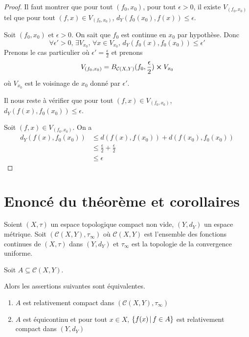 \ifdefined\outputproof
\begin{proof}
	Il faut montrer que pour tout $(f_{0}, x_{0})$, pour tout $\epsilon > 0$,
	il existe $V_{(f_{0}, x_{0})}$ tel que pour tout $(f, x) \in V_{(f_{0},
	x_{0})}$, $d_{Y}(f_{0}(x_{0}), f(x)) \leq \epsilon$.

	Soit $(f_{0}, x_{0})$ et $\epsilon > 0$. On sait que $f_{0}$ est continue en
	$x_{0}$ par hypothèse. Donc
	\begin{equation}
		\forall \epsilon' > 0, \, \exists V_{x_{0}}, \, \forall x \in V_{x_{0}},
		\, d_{Y}(f_{0}(x), f_{0}(x_{0})) \leq \epsilon'
	\end{equation}
	Prenons le cas particulier où $\epsilon' = \frac{\epsilon}{2}$ et prenons
	\begin{equation}
		V_{(f_{0}, x_{0})} = B_{\mathcal{C}(X, Y)}(f_{0}, \frac{\epsilon}{2})
		\cross V_{x_{0}}
	\end{equation}
	où $V_{x_{0}}$ est le voisinage de $x_{0}$ donné par $\epsilon'$.

	Il nous reste à vérifier que pour tout $(f, x) \in V_{(f_{0}, x_{0})}$,
	$d_{Y}(f(x), f_{0}(x_{0})) \leq \epsilon$.

	Soit $(f, x) \in V_{(f_{0}, x_{0})}$. On a
	\begin{align}
		d_{Y}(f(x), f_{0}(x_{0})) & \leq d(f(x), f(x_{0})) + d(f(x_{0}), f_{0}(x_{0}))
		\\
		& \leq \frac{\epsilon}{2} + \frac{\epsilon}{2} \\
		& \leq \epsilon
	\end{align}
\end{proof}
\fi

\section{Enoncé du théorème et corollaires}

\begin{theorem} 
	Soient $(X, \tau)$ un espace topologique compact non vide, $(Y, d_{Y})$ un
	espace métrique. Soit $(\mathcal{C}(X, Y), \tau_{\infty})$ où
	$\mathcal{C}(X, Y)$ est l'ensemble des fonctions continues de $(X, \tau)$
	dans $(Y, d_{Y})$ et $\tau_{\infty}$ est la topologie de la convergence uniforme.

	Soit $A \subseteq \mathcal{C}(X, Y)$.

	Alors les assertions suivantes sont équivalentes.
	\begin{enumerate}
		\item $A$ est relativement compact dans $(\mathcal{C}(X, Y),
			\tau_{\infty})$
		\item $A$ est équicontinu et pour tout $x \in X$, $\left\{f(x) \, | \, f \in
			A \right\}$ est relativement compact dans $(Y, d_{Y})$
	\end{enumerate}
\end{theorem}

